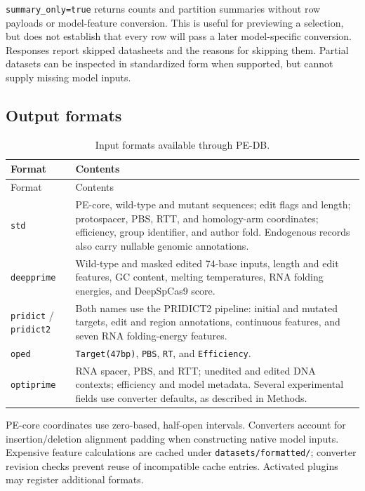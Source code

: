 \documentclass{article}
\begin{document}
\nolinkurl{summary_only=true} returns counts and partition summaries without row payloads or model-feature conversion. This is useful for previewing a selection, but does not establish that every row will pass a later model-specific conversion. Responses report skipped datasheets and the reasons for skipping them. Partial datasets can be inspected in standardized form when supported, but cannot supply missing model inputs.

\subsection{Output formats}

\begingroup
\small
\setlength{\tabcolsep}{4pt}
\begin{longtable}{@{}>{\raggedright\arraybackslash}p{}>{\raggedright\arraybackslash}p{}@{}}
    \caption{Input formats available through PE-DB.} \label{tab:app-formats} \\
    \hline
    Format & Contents \\
    \hline
    \endfirsthead
    \hline
    Format & Contents \\
    \hline
    \endhead
    \hline
    \endfoot
    \endlastfoot
    \nolinkurl{std} & PE-core, wild-type and mutant sequences; edit flags and length; protospacer, PBS, RTT, and homology-arm coordinates; efficiency, group identifier, and author fold. Endogenous records also carry nullable genomic annotations. \\
    \nolinkurl{deepprime} & Wild-type and masked edited 74-base inputs, length and edit features, GC content, melting temperatures, RNA folding energies, and DeepSpCas9 score. \\
    \nolinkurl{pridict} / \nolinkurl{pridict2} & Both names use the PRIDICT2 pipeline: initial and mutated targets, edit and region annotations, continuous features, and seven RNA folding-energy features. \\
    \nolinkurl{oped} & \nolinkurl{Target(47bp)}, \nolinkurl{PBS}, \nolinkurl{RT}, and \nolinkurl{Efficiency}. \\
    \nolinkurl{optiprime} & RNA spacer, PBS, and RTT; unedited and edited DNA contexts; efficiency and model metadata. Several experimental fields use converter defaults, as described in Methods. \\
\end{longtable}
\endgroup

PE-core coordinates use zero-based, half-open intervals. Converters account for insertion/deletion alignment padding when constructing native model inputs. Expensive feature calculations are cached under \nolinkurl{datasets/formatted/}; converter revision checks prevent reuse of incompatible cache entries. Activated plugins may register additional formats.
\end{document}
